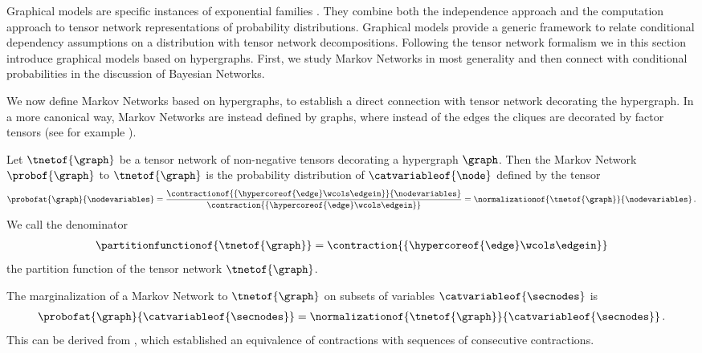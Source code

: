 Graphical models are specific instances of exponential families \cite{wainwright_graphical_2008, murphy_probabilistic_2022}.
They combine both the independence approach and the computation approach to tensor network representations of probability distributions.
Graphical models provide a generic framework to relate conditional dependency assumptions on a distribution with tensor network decompositions.
Following the tensor network formalism we in this section introduce graphical models based on hypergraphs.
First, we study Markov Networks in most generality and then connect with conditional probabilities in the discussion of Bayesian Networks.


We now define Markov Networks based on hypergraphs, to establish a direct connection with tensor network decorating the hypergraph.
In a more canonical way, Markov Networks are instead defined by graphs, where instead of the edges the cliques are decorated by factor tensors (see for example \cite{koller_probabilistic_2009}).

\begin{definition}
    \label{def:markovNetwork}
    Let $\tnetof{\graph}$ be a tensor network of non-negative tensors decorating a hypergraph $\graph$.
    Then the Markov Network $\probof{\graph}$ to $\tnetof{\graph}$ is the probability distribution of $\catvariableof{\node}$ defined by the tensor
    \begin{align*}
        \probofat{\graph}{\nodevariables} = \frac{
            \contractionof{\{\hypercoreof{\edge} \wcols \edgein\}}{\nodevariables}
        }{
            \contraction{\{\hypercoreof{\edge} \wcols \edgein\}}
        } = \normalizationof{\tnetof{\graph}}{\nodevariables} \, .
    \end{align*}
    We call the denominator
    \begin{align*}
        \partitionfunctionof{\tnetof{\graph}} = \contraction{\{\hypercoreof{\edge} \wcols \edgein\}}
    \end{align*}
    the partition function of the tensor network $\tnetof{\graph}$.
\end{definition}

The marginalization of a Markov Network to $\tnetof{\graph}$ on subsets of variables $\catvariableof{\secnodes}$ is
\begin{align*}
    \probofat{\graph}{\catvariableof{\secnodes}}
    = \normalizationof{\tnetof{\graph}}{\catvariableof{\secnodes}} \, .
\end{align*}
This can be derived from , which established an equivalence of contractions with sequences of consecutive contractions.

